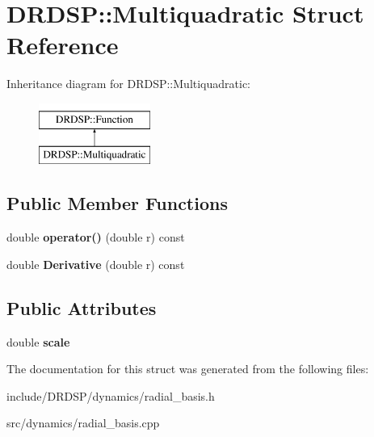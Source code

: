 \hypertarget{struct_d_r_d_s_p_1_1_multiquadratic}{\section{D\-R\-D\-S\-P\-:\-:Multiquadratic Struct Reference}
\label{struct_d_r_d_s_p_1_1_multiquadratic}
}
Inheritance diagram for D\-R\-D\-S\-P\-:\-:Multiquadratic\-:\begin{figure}[H]
\begin{center}
\leavevmode
\includegraphics[height=2.000000cm]{struct_d_r_d_s_p_1_1_multiquadratic}
\end{center}
\end{figure}
\subsection*{Public Member Functions}
\begin{DoxyCompactItemize}
\item 
\hypertarget{struct_d_r_d_s_p_1_1_multiquadratic_af06319ae007aa40fbd2833759161437f}{double {\bfseries operator()} (double r) const }\label{struct_d_r_d_s_p_1_1_multiquadratic_af06319ae007aa40fbd2833759161437f}

\item 
\hypertarget{struct_d_r_d_s_p_1_1_multiquadratic_afba9d7a5aeb541953b9a54919b013f5f}{double {\bfseries Derivative} (double r) const }\label{struct_d_r_d_s_p_1_1_multiquadratic_afba9d7a5aeb541953b9a54919b013f5f}

\end{DoxyCompactItemize}
\subsection*{Public Attributes}
\begin{DoxyCompactItemize}
\item 
\hypertarget{struct_d_r_d_s_p_1_1_multiquadratic_ad075ed2b3b85cab9d74369163eab65cf}{double {\bfseries scale}}\label{struct_d_r_d_s_p_1_1_multiquadratic_ad075ed2b3b85cab9d74369163eab65cf}

\end{DoxyCompactItemize}


The documentation for this struct was generated from the following files\-:\begin{DoxyCompactItemize}
\item 
include/\-D\-R\-D\-S\-P/dynamics/radial\-\_\-basis.\-h\item 
src/dynamics/radial\-\_\-basis.\-cpp\end{DoxyCompactItemize}
